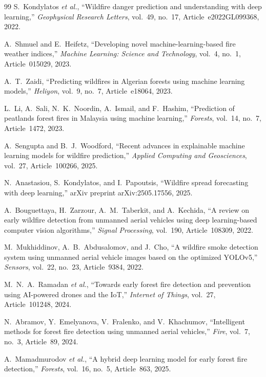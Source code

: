\documentclass[11pt,a4paper]{report}
\begin{document}
\begin{thebibliography}{99}
S.~Kondylatos \emph{et al.}, ``Wildfire danger prediction and understanding with deep learning,'' \emph{Geophysical Research Letters}, vol.~49, no.~17, Article~e2022GL099368, 2022.

A.~Shmuel and E.~Heifetz, ``Developing novel machine-learning-based fire weather indices,'' \emph{Machine Learning: Science and Technology}, vol.~4, no.~1, Article~015029, 2023.

A.~T.~Zaidi, ``Predicting wildfires in Algerian forests using machine learning models,'' \emph{Heliyon}, vol.~9, no.~7, Article~e18064, 2023.

L.~Li, A.~Sali, N.~K.~Noordin, A.~Ismail, and F.~Hashim, ``Prediction of peatlands forest fires in Malaysia using machine learning,'' \emph{Forests}, vol.~14, no.~7, Article~1472, 2023.

A.~Sengupta and B.~J.~Woodford, ``Recent advances in explainable machine learning models for wildfire prediction,'' \emph{Applied Computing and Geosciences}, vol.~27, Article~100266, 2025.

N.~Anastasiou, S.~Kondylatos, and I.~Papoutsis, ``Wildfire spread forecasting with deep learning,'' arXiv preprint arXiv:2505.17556, 2025.

A.~Bouguettaya, H.~Zarzour, A.~M.~Taberkit, and A.~Kechida, ``A review on early wildfire detection from unmanned aerial vehicles using deep learning-based computer vision algorithms,'' \emph{Signal Processing}, vol.~190, Article~108309, 2022.

M.~Mukhiddinov, A.~B.~Abdusalomov, and J.~Cho, ``A wildfire smoke detection system using unmanned aerial vehicle images based on the optimized YOLOv5,'' \emph{Sensors}, vol.~22, no.~23, Article~9384, 2022.

M.~N.~A.~Ramadan \emph{et al.}, ``Towards early forest fire detection and prevention using AI-powered drones and the IoT,'' \emph{Internet of Things}, vol.~27, Article~101248, 2024.

N.~Abramov, Y.~Emelyanova, V.~Fralenko, and V.~Khachumov, ``Intelligent methods for forest fire detection using unmanned aerial vehicles,'' \emph{Fire}, vol.~7, no.~3, Article~89, 2024.

A.~Mamadmurodov \emph{et al.}, ``A hybrid deep learning model for early forest fire detection,'' \emph{Forests}, vol.~16, no.~5, Article~863, 2025.


\end{thebibliography}
\end{document}
